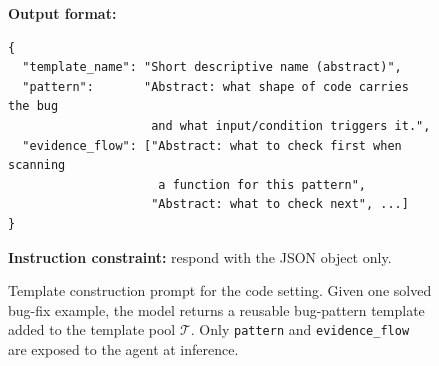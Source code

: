 \documentclass{llmxive}
\begin{document}
\begin{figure}[!t]
\begin{tcolorbox}[colback=gray!5, colframe=gray!50,
                  boxrule=0.5pt, arc=2mm,
                  left=4pt, right=4pt, top=3pt, bottom=3pt]
\medskip
\textbf{Output format:}
\begin{verbatim}
{
  "template_name": "Short descriptive name (abstract)",
  "pattern":       "Abstract: what shape of code carries the bug
                    and what input/condition triggers it.",
  "evidence_flow": ["Abstract: what to check first when scanning
                     a function for this pattern",
                    "Abstract: what to check next", ...]
}
\end{verbatim}

\textbf{Instruction constraint:} respond with the JSON object only.
\end{tcolorbox}
\caption{Template construction prompt for the code setting. Given one solved bug-fix example, the model returns a reusable bug-pattern template added to the template pool $\mathcal{T}$. Only \texttt{pattern} and \texttt{evidence\_flow} are exposed to the agent at inference.}
\label{fig:prompt_template_construction_code}
\end{figure}
\end{document}
